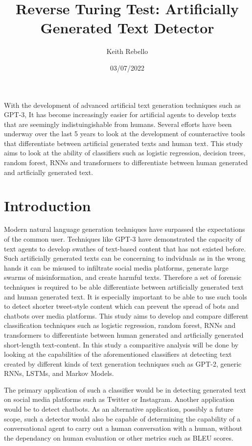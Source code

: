 \documentclass[12pt]{article}
\title{Reverse Turing Test: Artificially Generated Text Detector}
\author{Keith Rebello}
\date{03/07/2022}
\begin{document}
\maketitle

\abstract
With the development of advanced artificial text generation techniques such as GPT-3, It has become increasingly easier for artificial agents to develop texts that are seemingly indistuingishable from humans. Several efforts have been underway over the last 5 years to look at the development of counteractive tools that differentiate between artificial generated texts and human text. This study aims to look at the ability of classifiers such as logistic regression, decision trees, random forest, RNNs and transformers to differentiate between human generated and artficially generated text. 

\section{Introduction}
Modern natural language generation techniques have surpassed the expectations of the common user. Techniques like GPT-3 have demonstrated the capacity of text agents to develop swathes of text-based content that has not existed before. Such artificially generated texts can be concerning to indviduals as in the wrong hands it can be misused to infiltrate social media platforms, generate large swarms of misinformation, and create harmful texts. Therefore a set of forensic techniques is required to be able differentiate between artificially generated text and human generated text. It is especially important to be able to use such tools to detect shorter tweet-style content which can prevent the spread of bots and chatbots over media platforms. This study aims to develop and compare different classification techniques such as logistic regression, random forest, RNNs and transformers to differentiate between human generated and artficially generated short-length text-content. In this study a comparitive analysis will be done by looking at the capabilities of the aforementioned classifiers at detecting text created by different kinds of text generation techniques such as GPT-2, generic RNNs, LSTMs, and Markov Models.

The primary application of such a classifier would be in detecting generated text on social media platforms such as Twitter or Instagram. Another application would be to detect chatbots. As an alternative application, possibly a future scope, such a detector would also be capable of determining the capability of a conversational agent to carry out a human conversation with a human, without the dependancy on human evaluation or other metrics such as BLEU scores.
\end{document}
